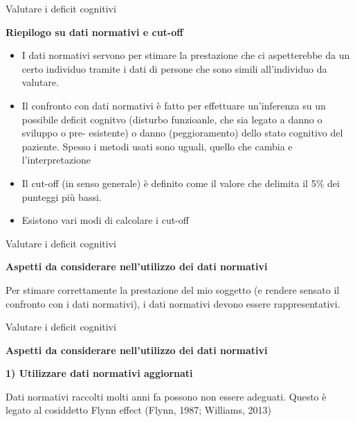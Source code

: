 \documentclass[
  ignorenonframetext,
]{beamer}
\begin{document}
\begin{frame}{Valutare i deficit cognitivi}
\label{valutare-i-deficit-cognitivi-49}
\begin{center}
  \textbf{Riepilogo su dati normativi e cut-off}
\end{center}
\vspace{1em}

\begin{itemize}
\item
  I dati normativi servono per stimare la prestazione che ci
  aspetterebbe da un certo individuo tramite i dati di persone che sono
  simili all'individuo da valutare.
\item
  Il confronto con dati normativi è fatto per effettuare un'inferenza su
  un possibile deficit cognitvo (disturbo funzioanle, che sia legato a
  danno o sviluppo o pre- esistente) o danno (peggioramento) dello stato
  cognitivo del paziente. Spesso i metodi usati sono uguali, quello che
  cambia e l'interpretazione
\item
  Il cut-off (in senso generale) è definito come il valore che delimita
  il 5\% dei punteggi più bassi.
\item
  Esistono vari modi di calcolare i cut-off
\end{itemize}
\end{frame}

\begin{frame}{Valutare i deficit cognitivi}
\label{valutare-i-deficit-cognitivi-50}
\begin{center}
  \textbf{Aspetti da considerare nell’utilizzo dei dati normativi}
\end{center}
\vspace{2em}

Per stimare correttamente la prestazione del mio soggetto (e rendere
sensato il confronto con i dati normativi), i dati normativi devono
essere rappresentativi.
\end{frame}

\begin{frame}{Valutare i deficit cognitivi}
\label{valutare-i-deficit-cognitivi-51}
\begin{center}
  \textbf{Aspetti da considerare nell’utilizzo dei dati normativi}
\end{center}
\vspace{2em}

\textbf{1) Utilizzare dati normativi aggiornati} \vspace{2em}

Dati normativi raccolti molti anni fa possono non essere adeguati.
Questo è legato al cosiddetto Flynn effect (Flynn, 1987; Williams, 2013)
\end{frame}
\end{document}
